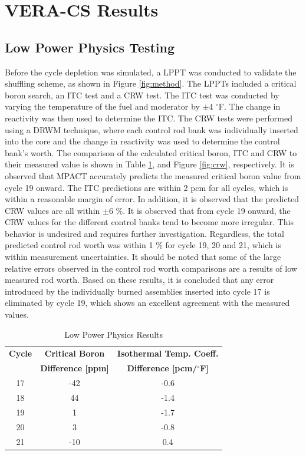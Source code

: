\documentclass[edeposit,fullpage,11pt]{uiucthesis2009}
\begin{document}
\section{VERA-CS Results}

\subsection{Low Power Physics Testing}
Before the cycle depletion was simulated, a \gls{LPPT} was conducted to validate the shuffling scheme, as shown in Figure \ref{fig:method}.
The \gls{LPPT}s included a critical boron search, an \gls{ITC} test and a \gls{CRW} test. 
The \gls{ITC} test was conducted by varying the temperature of the fuel and moderator by $\pm$4 $^\circ$F. 
The change in reactivity was then used to determine the \gls{ITC}. 
The \gls{CRW} tests were performed using a \gls{DRWM} technique, where each control rod bank was individually inserted into the core and the change in reactivity was used to determine the control bank's worth. 
The comparison of the calculated critical boron, \gls{ITC} and \gls{CRW} to their measured value is shown in Table \ref{tab:cb}, and Figure \ref{fig:crw}, respectively. 
It is observed that MPACT accurately predicts the measured critical boron value from cycle 19 onward.
The \gls{ITC} predictions are within 2 pcm for all cycles, which is within a reasonable margin of error.
In addition, it is observed that the predicted \gls{CRW} values are all within $\pm6$ \%.
It is observed that from cycle 19 onward, the \gls{CRW} values for the different control banks tend to become more irregular.
This behavior is undesired and requires further investigation.
Regardless, the total predicted control rod worth was within 1 \% for cycle 19, 20 and 21, which is within measurement uncertainties. 
It should be noted that some of the large relative errors observed in the control rod worth comparisons are a results of low measured rod worth. 
Based on these results, it is concluded that any error introduced by the individually burned assemblies inserted into cycle 17 is eliminated by cycle 19, which shows an excellent agreement with the measured values. 

\begin{table}
\caption{Low Power Physics Results}
\label{tab:cb}
\begin{center}
\begin{tabular}[!t]{ccc}
\textbf{Cycle}      & \textbf{Critical Boron}   & \textbf{Isothermal Temp. Coeff.}      \\
           & \textbf{Difference [ppm]} & \textbf{Difference [pcm/$^{\circ}$F]}  \\ 
17 & -42 & -0.6     \\
18 & 44  & -1.4     \\
19 & 1   & -1.7     \\
20 & 3   & -0.8    \\
21 & -10 &  0.4     \\
\end{tabular}
\end{center}
\end{table}
\end{document}
